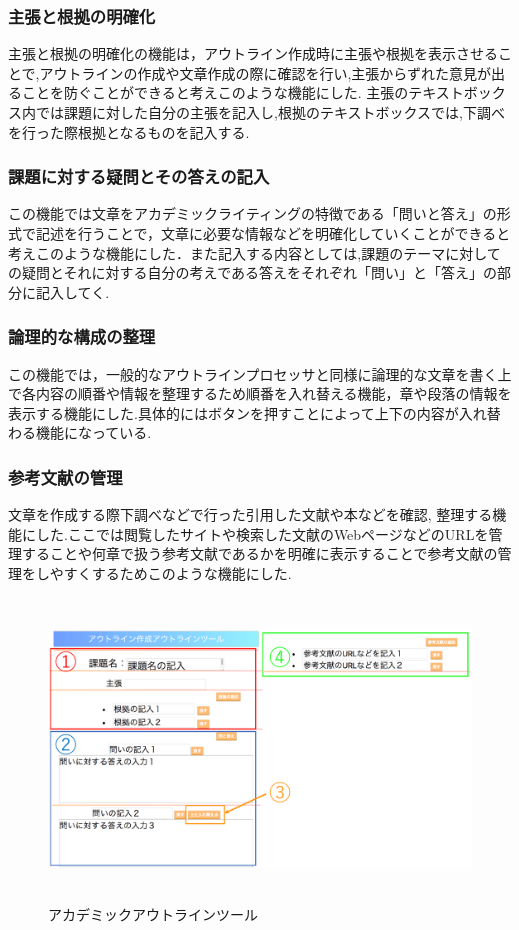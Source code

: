 \documentclass[a4j,12pt]{jarticle}
\begin{document}
\subsubsection{主張と根拠の明確化}
主張と根拠の明確化の機能は，アウトライン作成時に主張や根拠を表示させることで,アウトラインの作成や文章作成の際に確認を行い,主張からずれた意見が出ることを防ぐことができると考えこのような機能にした.
主張のテキストボックス内では課題に対した自分の主張を記入し,根拠のテキストボックスでは,下調べを行った際根拠となるものを記入する.

\subsubsection{課題に対する疑問とその答えの記入}
この機能では文章をアカデミックライティングの特徴である「問いと答え」の形式で記述を行うことで，文章に必要な情報などを明確化していくことができると考えこのような機能にした．また記入する内容としては,課題のテーマに対しての疑問とそれに対する自分の考えである答えをそれぞれ「問い」と「答え」の部分に記入してく.

\subsubsection{論理的な構成の整理}
この機能では，一般的なアウトラインプロセッサと同様に論理的な文章を書く上で各内容の順番や情報を整理するため順番を入れ替える機能，章や段落の情報を表示する機能にした.具体的にはボタンを押すことによって上下の内容が入れ替わる機能になっている.

\subsubsection{参考文献の管理}
文章を作成する際下調べなどで行った引用した文献や本などを確認, 整理する機能にした.ここでは閲覧したサイトや検索した文献のWebページなどのURLを管理することや何章で扱う参考文献であるかを明確に表示することで参考文献の管理をしやすくするためこのような機能にした.
\begin{figure}[h]
\begin{center}
 \includegraphics[clip,width=150mm,height=80mm]{pp01.pdf}
\end{center}
 \caption{アカデミックアウトラインツール}
 \label{fig:g}
\end{figure}
\end{document}
